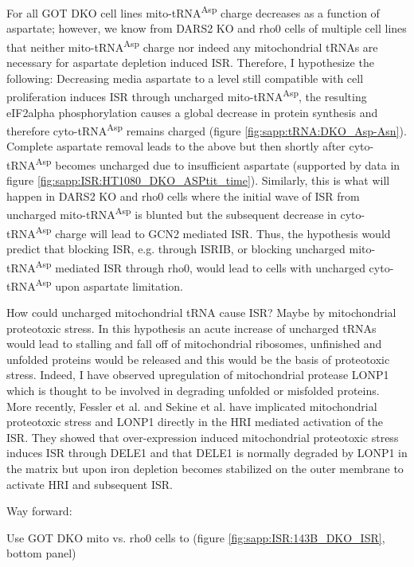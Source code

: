 For all GOT DKO cell lines mito-tRNA\textsuperscript{Asp} charge decreases as a function of aspartate; however, we know from DARS2 KO and rho0 cells of multiple cell lines that neither mito-tRNA\textsuperscript{Asp} charge nor indeed any mitochondrial tRNAs are necessary for aspartate depletion induced ISR.
Therefore, I hypothesize the following:
Decreasing media aspartate to a level still compatible with cell proliferation induces ISR through uncharged mito-tRNA\textsuperscript{Asp}, the resulting eIF2alpha phosphorylation causes a global decrease in protein synthesis and therefore cyto-tRNA\textsuperscript{Asp} remains charged (figure \ref{fig:sapp:tRNA:DKO_Asp-Asn}).
Complete aspartate removal leads to the above but then shortly after cyto-tRNA\textsuperscript{Asp} becomes uncharged due to insufficient aspartate (supported by data in figure \ref{fig:sapp:ISR:HT1080_DKO_ASPtit_time}).
Similarly, this is what will happen in DARS2 KO and rho0 cells where the initial wave of ISR from uncharged mito-tRNA\textsuperscript{Asp} is blunted but the subsequent decrease in cyto-tRNA\textsuperscript{Asp} charge will lead to GCN2 mediated ISR.
Thus, the hypothesis would predict that blocking ISR, e.g. through ISRIB, or blocking uncharged mito-tRNA\textsuperscript{Asp} mediated ISR through rho0, would lead to cells with uncharged cyto-tRNA\textsuperscript{Asp} upon aspartate limitation.

How could uncharged mitochondrial tRNA cause ISR?
Maybe by mitochondrial proteotoxic stress.
In this hypothesis an acute increase of uncharged tRNAs would lead to stalling and fall off of mitochondrial ribosomes, unfinished and unfolded proteins would be released and this would be the basis of proteotoxic stress.
Indeed, I have observed upregulation of mitochondrial protease LONP1 which is thought to be involved in degrading unfolded or misfolded proteins.
More recently, Fessler et al. \cite{Fessler2022-ho} and Sekine et al. \cite{Sekine2023-qh} have implicated mitochondrial proteotoxic stress and LONP1 directly in the HRI mediated activation of the ISR.
They showed that over-expression induced mitochondrial proteotoxic stress induces ISR through DELE1 and that DELE1 is normally degraded by LONP1 in the matrix but upon iron depletion becomes stabilized on the outer membrane to activate HRI and subsequent ISR.








Way forward:

Use GOT DKO mito vs. rho0 cells to 
(figure \ref{fig:sapp:ISR:143B_DKO_ISR}, bottom panel)


